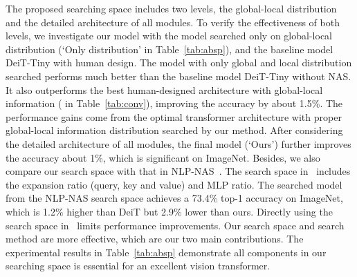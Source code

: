 \documentclass[10pt,twocolumn,letterpaper]{article}
\begin{document}
The proposed searching space includes two levels, the global-local distribution and the detailed architecture of all modules. To verify the effectiveness of both levels, we investigate our model with the model searched only on global-local distribution (`Only distribution' in Table~\ref{tab:absp}), and the baseline model DeiT-Tiny with human design.
The model with only global and local distribution searched performs much better than the baseline model DeiT-Tiny without NAS. It also outperforms the best human-designed architecture with global-local information ( in Table~\ref{tab:conv}), improving the accuracy by about 1.5\%. The performance gains come from the optimal transformer architecture with proper global-local information distribution searched by our method. After considering the detailed architecture of all modules, the final model (`Ours') further improves the accuracy about 1\%, which is significant on ImageNet.  Besides, we also compare our search space with that in NLP-NAS~\cite{findfast-2020}. The search space in~\cite{findfast-2020} includes the expansion ratio (query, key and value) and MLP ratio. The searched model from the NLP-NAS search space achieves a 73.4\% top-1 accuracy on ImageNet, which is 1.2\% higher than DeiT but 2.9\% lower than ours. Directly using the search space in~\cite{findfast-2020} limits performance improvements. Our search space and search method are more effective, which are our two main contributions. The experimental results in Table~\ref{tab:absp} demonstrate all components in our searching space is essential for an excellent vision transformer.

\begin{table}[H]
	\centering
	\caption{Performance comparisons of models from different searching spaces on ImageNet. `DeiT-Tiny' is the baseline model which totally relies on hand-designing. `Only distribution' is the model searched only on global-local distribution. `Ours' is the model searched from the complete searching space. }
	
	\centering
	 \vspace{-12pt}
	\label{tab:absp}
\end{table}
\end{document}

